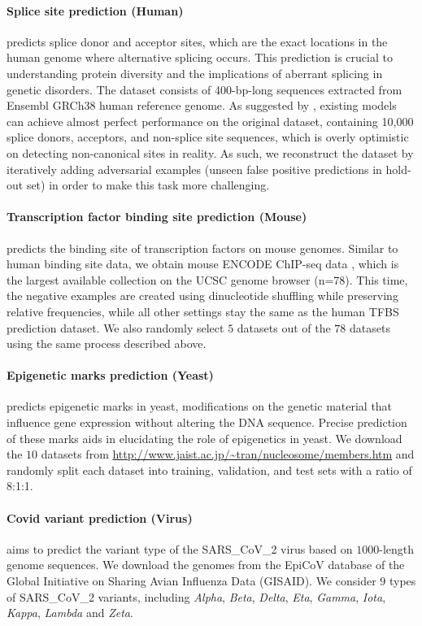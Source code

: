 \documentclass{article}
\begin{document}
\paragraph{Splice site prediction (Human)} predicts splice donor and acceptor sites, which are the exact locations in the human genome where alternative splicing occurs. This prediction is crucial to understanding protein diversity and the implications of aberrant splicing in genetic disorders. The dataset \citep{wang2019splicefinder} consists of 400-bp-long sequences extracted from Ensembl GRCh38 human reference genome. As suggested by \citet{dnabert}, existing models can achieve almost perfect performance on the original dataset, containing 10,000 splice donors, acceptors, and non-splice site sequences, which is overly optimistic on detecting non-canonical sites in reality. As such, we reconstruct the dataset by iteratively adding adversarial examples (unseen false positive predictions in hold-out set) in order to make this task more challenging.  




\paragraph{Transcription factor binding site prediction (Mouse)} predicts the binding site of transcription factors on mouse genomes. Similar to human binding site data, we obtain mouse ENCODE ChIP-seq data \citep{mouse}, which is the largest available collection on the UCSC genome browser (n=78). This time, the negative examples are created using dinucleotide shuffling while preserving relative frequencies, while all other settings stay the same as the human TFBS prediction dataset. We also randomly select $5$ datasets out of the $78$ datasets using the same process described above.


\paragraph{Epigenetic marks prediction (Yeast)}  predicts epigenetic marks in yeast, modifications on the genetic material that influence gene expression without altering the DNA sequence. Precise prediction of these marks aids in elucidating the role of epigenetics in yeast. We download the $10$ datasets from \url{http://www.jaist.ac.jp/~tran/nucleosome/members.htm} and randomly split each dataset into training, validation, and test sets with a ratio of 8:1:1.


\paragraph{Covid variant prediction (Virus)} aims to predict the variant type of the SARS\_CoV\_2 virus based on $1000$-length genome sequences. We download the genomes from the EpiCoV database \citep{covid} of the Global Initiative on Sharing Avian Influenza Data (GISAID). We consider $9$ types of SARS\_CoV\_2 variants, including \textit{Alpha}, \textit{Beta}, \textit{Delta}, \textit{Eta}, \textit{Gamma}, \textit{Iota}, \textit{Kappa}, \textit{Lambda} and \textit{Zeta}.
\end{document}
